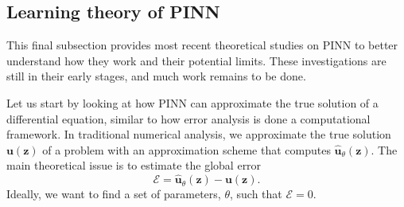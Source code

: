 \documentclass[pdflatex,sn-basic]{sn-jnl}%
\theoremstyle{thmstyleone}%
\theoremstyle{thmstyletwo}%
\theoremstyle{thmstylethree}%
\begin{document}






\subsection{Learning theory of PINN }\label{sec:Theory}

This final subsection provides most recent theoretical studies on PINN to better understand how they work and their potential limits.
These investigations are still in their early stages, and much work remains to be done.


Let us start by looking at how PINN can approximate the true solution of a differential equation, similar to how error analysis is done a computational framework. 
In traditional numerical analysis, we approximate the true solution $\bm{u}(\bm{z})$  of a problem with an approximation scheme that computes $\hat{\bm{u}}_\theta(\bm{z})$. The main theoretical issue is to estimate the global error 
$$\mathcal{E} = \hat{\bm{u}}_\theta(\bm{z}) - \bm{u}(\bm{z}).$$ 
Ideally, we want to find a set of parameters, $\theta$, such that $\mathcal{E}=0$.
\end{document}

